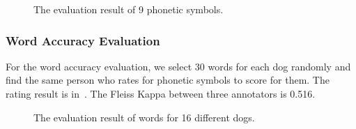 \begin{figure}[th]
\centering
{}
\caption{The evaluation result of 9 phonetic symbols. }
\label{fig:phoneticaccuracy}
\end{figure}


\subsubsection{Word Accuracy Evaluation}
For the word accuracy evaluation, we select 30 words for each dog randomly and find the same person who rates for phonetic symbols to score for them. The rating result is in~. The Fleiss Kappa between three annotators is 0.516.

\begin{figure}[th]
\centering
{}
\caption{The evaluation result of words for 16 different dogs.}
\label{fig:wordaccuracy}
\end{figure}
